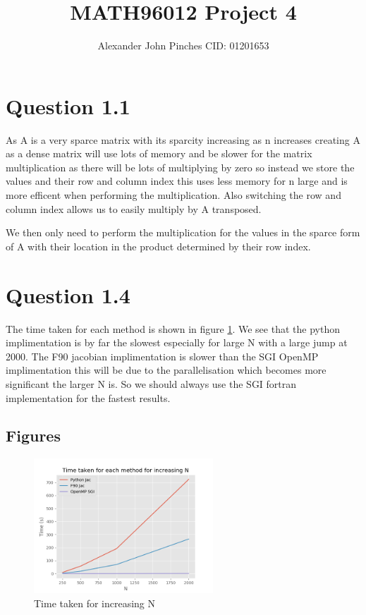 \documentclass{article}
\title{MATH96012 Project 4}
\author{Alexander John Pinches CID: 01201653}
\begin{document}
\maketitle



\section*{Question 1.1}
As A is a very sparce matrix with its sparcity increasing as n increases 
creating A as a dense matrix will use lots of memory and be slower for
the matrix multiplication as there will be lots of multiplying by zero
so instead we store the values and their row and column index this uses
less memory for n large and is more efficent when performing the multiplication.
Also switching the row and column index allows us to easily multiply by A transposed. 

We then only need to perform the multiplication for the values in the sparce form of A
with their location in the product determined by their row index.

\section*{Question 1.4}
The time taken for each method is shown in figure \ref{fig1}. We see that the
python implimentation is by far the slowest especially for large N with a large jump
at 2000. The F90 jacobian implimentation is slower than the SGI OpenMP implimentation
this will be due to the parallelisation which becomes more significant the larger N is.
So we should always use the SGI fortran implementation for the fastest results.
 \newpage

\subsection*{Figures}
\begin{figure}[h!]
\centering
\includegraphics[width=0.6\textwidth]{time.png}
\caption{Time taken for increasing N}
\label{fig1}
\end{figure}
\end{document}
